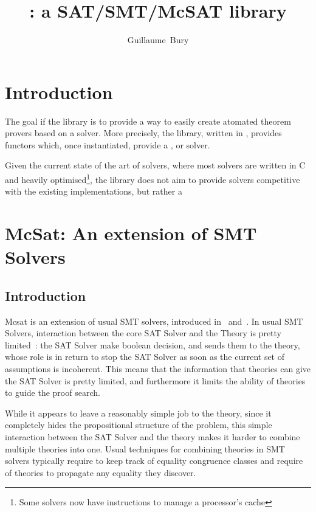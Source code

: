 \documentclass{article}
\begin{document}
\title{\msat{}: a SAT/SMT/McSAT library}
\author{Guillaume~Bury}

\maketitle

\section{Introduction}

The goal if the \msat{} library is to provide a way to easily
create atomated theorem provers based on a \sat{} solver. More precisely,
the library, written in \ocaml{}, provides functors which, once instantiated,
provide a \sat{}, \smt{} or \mcsat{} solver.

Given the current state of the art of \smt{} solvers, where most \sat{} solvers
are written in C and heavily optimised\footnote{Some solvers now have instructions
to manage a processor's cache}, the \msat{} library does not aim to provide solvers
competitive with the existing implementations, but rather a 

\section{McSat: An extension of SMT Solvers}

\subsection{Introduction}


Mcsat is an extension of usual SMT solvers, introduced in~\cite{VMCAI13} and~\cite{FMCAD13}.
In usual SMT Solvers, interaction between the core SAT Solver and the Theory is pretty limited~:
the SAT Solver make boolean decision, and sends them to the theory, whose role is in return to
stop the SAT Solver as soon as the current set of assumptions is incoherent. This means
that the information that theories can give the SAT Solver is pretty limited, and furthermore
it limits the ability of theories to guide the proof search.

While it appears to leave a reasonably simple job to the theory, since it completely
hides the propositional structure of the problem, this simple interaction between the
SAT Solver and the theory makes it harder to combine multiple theories into one. Usual
techniques for combining theories in SMT solvers typically require to keep track of
equality congruence classes and require of theories to propagate any equality they discover.
\end{document}
